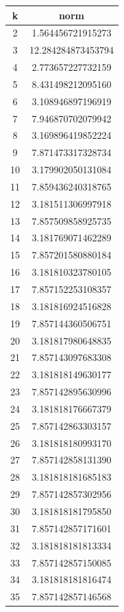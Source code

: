 \documentclass[12pt,a4paper,UTF8]{ctexart}
\begin{document}
\begin{enumerate}
\begin{longtable}{c|c}
 
k  & norm               \\ \hline
2  & 1.564456721915273  \\ \hline
3  & 12.284284873453794 \\ \hline
4  & 2.773657227732159  \\ \hline
5  & 8.431498212095160  \\ \hline
6  & 3.108946897196919  \\ \hline
7  & 7.946870702079942  \\ \hline
8  & 3.169896419852224  \\ \hline
9  & 7.871473317328734  \\ \hline
10 & 3.179902050131084  \\ \hline
11 & 7.859436240318765  \\ \hline
12 & 3.181511306997918  \\ \hline
13 & 7.857509858925735  \\ \hline
14 & 3.181769071462289  \\ \hline
15 & 7.857201580880184  \\ \hline
16 & 3.181810323780105  \\ \hline
17 & 7.857152253108357  \\ \hline
18 & 3.181816924516828  \\ \hline
19 & 7.857144360506751  \\ \hline
20 & 3.181817980648835  \\ \hline
21 & 7.857143097683308  \\ \hline
22 & 3.181818149630177  \\ \hline
23 & 7.857142895630996  \\ \hline
24 & 3.181818176667379  \\ \hline
25 & 7.857142863303157  \\ \hline
26 & 3.181818180993170  \\ \hline
27 & 7.857142858131390  \\ \hline
28 & 3.181818181685183  \\ \hline
29 & 7.857142857302956  \\ \hline
30 & 3.181818181795850  \\ \hline
31 & 7.857142857171601  \\ \hline
32 & 3.181818181813334  \\ \hline
33 & 7.857142857150085  \\ \hline
34 & 3.181818181816474  \\ \hline
35 & 7.857142857146568  \\ \hline

\end{longtable}
\end{enumerate}
\end{document}
